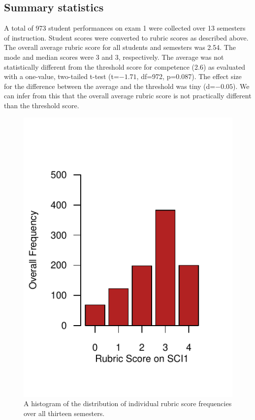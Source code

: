 \documentclass[fleqn,10pt]{SelfArx}\usepackage[]{graphicx}\usepackage[]{color}
\begin{document}
\subsection{Summary statistics}
A total of 973 student performances on exam 1 were collected over 13 semesters of instruction. Student scores were converted to rubric scores as described above. The overall average rubric score for all students and semesters was 2.54. The mode and median scores were 3 and 3, respectively. The average was not statistically different from the threshold score for competence (2.6) as evaluated with a one-value, two-tailed t-test (t=\ensuremath{-1.71}, df=972, p=0.087). The effect size for the difference between the average and the threshold was tiny (d=\ensuremath{-0.05}). We can infer from this that the overall average rubric score is not practically different than the threshold score.
\begin{figure}[h]\centering

\includegraphics[width=\columnwidth,viewport = 0 20 216 240]{./figure/histogram}
\protect\caption{A histogram of the distribution of individual rubric score frequencies over all thirteen semesters.}
\label{fig:histogram}
\end{figure}
\end{document}
